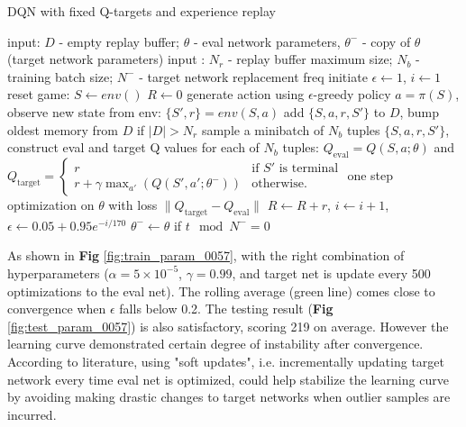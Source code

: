 \documentclass[10pt]{article}
\begin{document}
\begin{algorithm}
\caption{DQN with fixed Q-targets and experience replay}
\begin{algorithmic}
\STATE input: $D$ - empty replay buffer; $\theta$ - eval network parameters, $\theta^-$ - copy of $\theta$ (target network parameters)
\STATE input : $N_r$ - replay buffer maximum size; $N_b$ - training batch size; $N^-$ - target network replacement freq
\STATE initiate $\epsilon \leftarrow 1$, $i \leftarrow 1$
\REPEAT
\STATE reset game: $S\leftarrow env()$
\STATE $R\leftarrow 0$
\STATE generate action using $\epsilon$-greedy policy $a=\pi(S)$, observe new state from env: $\{S',r\} = env(S,a)$
\STATE add $\{S,a,r,S'\}$ to $D$, bump oldest memory from $D$ if $|D|> N_r$
\STATE sample a minibatch of $N_b$ tuples $\{S,a,r,S'\}$, construct eval and target Q values for each of $N_b$ tuples:
\STATE $Q_{\text{eval}}=Q(S,a;\theta)$ and $Q_{\text{target}}=\left\{
\begin{array}{lr}
             r & \text{if $S'$ is terminal} \\
             r+\gamma \max_{a'}(Q(S',a';\theta^-)) & \text{otherwise.}
\end{array}
\right.
$
\STATE one step optimization on $\theta$ with loss $\lVert Q_{\text{target}}-Q_{\text{eval}}\rVert$
\STATE $R\leftarrow R+r$, $i \leftarrow i+1$, $\epsilon\leftarrow 0.05+0.95e^{-i/170}$
\STATE $\theta^- \leftarrow \theta$ if $t\mod N^- = 0$
\ENDFOR
{}
\end{algorithmic}
\end{algorithm}

As shown in \textbf{Fig} \ref{fig:train_param_0057}, with the right combination of hyperparameters ($\alpha=5\times 10^{-5}$, $\gamma=0.99$, and target net is update every 500 optimizations to the eval net). The rolling average (green line) comes close to convergence when $\epsilon$ falls below 0.2. The testing result (\textbf{Fig} \ref{fig:test_param_0057}) is also satisfactory, scoring 219 on average. However the learning curve demonstrated certain degree of instability after convergence. According to literature, using "soft updates", i.e. incrementally updating target network every time eval net is optimized, could help stabilize the learning curve by avoiding making drastic changes to target networks when outlier samples are incurred.
\end{document}
